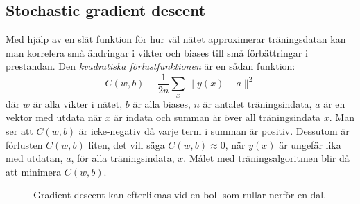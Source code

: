 \subsection{Stochastic gradient descent}
Med hjälp av en slät funktion för hur väl nätet approximerar träningsdatan
kan man korrelera små ändringar i vikter och biases
till små förbättringar i prestandan.
Den \emph{kvadratiska förlustfunktionen} är en sådan funktion:
\begin{equation} \label{eq:cost}
	C(w, b) \equiv \frac{1}{2n} \displaystyle\sum_x \lVert y(x) - a \rVert^2
\end{equation}
där $ w $ är alla vikter i nätet, $ b $ är alla biases,
$ n $ är antalet träningsindata, $ a $ är en vektor med utdata när $ x $ är indata
och summan är över all träningsindata $ x $.
Man ser att $ C(w, b) $ är icke-negativ då varje term i summan är positiv.
Dessutom är förlusten $ C(w, b) $ liten, det vill säga $ C(w, b) \approx 0 $,
när $ y(x) $ är ungefär lika med utdatan, $ a $, för alla träningsindata, $ x $.
Målet med träningsalgoritmen blir då att minimera $ C(w, b) $.

\begin{figure}
	\centering
	\caption{Gradient descent kan efterliknas vid en boll som rullar nerför en dal.}
	\label{fig:descent}
\end{figure}

